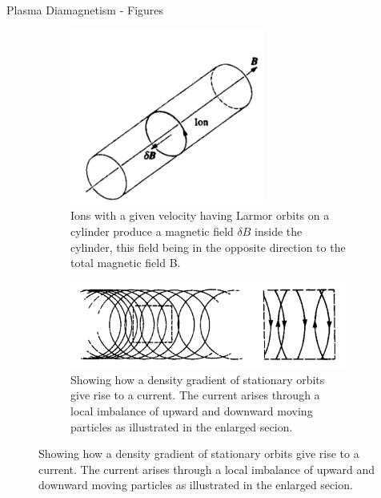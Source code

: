 \begin{frame}{Plasma Diamagnetism - Figures}
    \begin{figure}
        \begin{subfigure}[b]{0.4\textwidth}
            \centering
            \includegraphics[width=0.7\textwidth]{figures/plasma-diamagnetism.png}
            \caption{Ions with a given velocity having Larmor orbits on a cylinder produce a magnetic field $\delta B$ inside the cylinder, this field being in the opposite direction to the total magnetic field B.}
            \label{fig:plasma-diamagnetism}
        \end{subfigure}%
        \begin{subfigure}[b]{0.4\textwidth}
            \centering
            \includegraphics[width=\textwidth]{figures/diamagnetic-current.png}
            \caption{Showing how a density gradient of stationary orbits give rise to a current. The current arises through a local imbalance of upward and downward moving particles as illustrated in the enlarged secion.}
            \label{fig:diamagnetic-current}
        \end{subfigure}
    \end{figure}
\end{frame}

